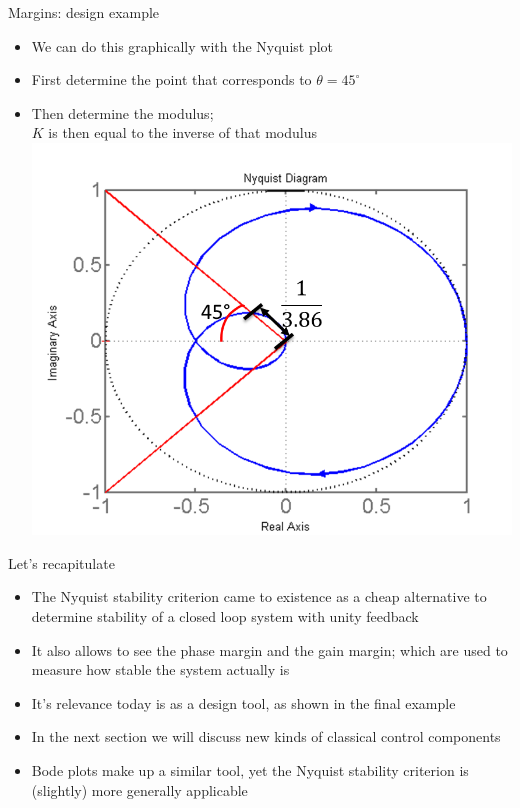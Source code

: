 \begin{frame}{Margins: design example}
\begin{itemize}
\item We can do this graphically with the Nyquist plot
\item First determine the point that corresponds to $\theta = 45^{\circ}$
\item Then determine the modulus;
\\ $K$ is then equal to the inverse of that modulus
\\ \includegraphics[width=0.7\linewidth]{Afbeelding23}
\end{itemize}
\end {frame}

\begin{frame}{Let's recapitulate}
\begin{itemize}
\item The Nyquist stability criterion came to existence as a cheap alternative to determine stability of a closed loop system with unity feedback
\item It also allows to see the phase margin and the gain margin; which are used to measure how stable the system actually is 
\item It’s relevance today is as a design tool, as shown in the final example
\item In the next section we will discuss new kinds of classical control components 
\item Bode plots make up a similar tool, yet the Nyquist stability criterion is (slightly) more generally applicable
\end{itemize}
\end {frame}

